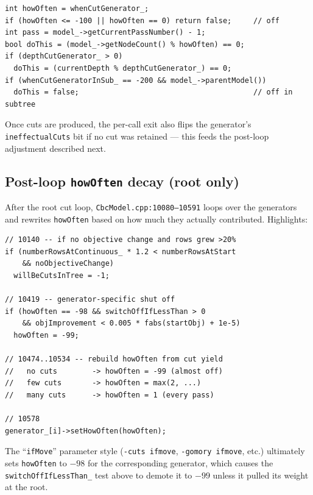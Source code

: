 \documentclass[11pt,a4paper]{article}
\begin{document}
\begin{lstlisting}
int howOften = whenCutGenerator_;
if (howOften <= -100 || howOften == 0) return false;     // off
int pass = model_->getCurrentPassNumber() - 1;
bool doThis = (model_->getNodeCount() % howOften) == 0;
if (depthCutGenerator_ > 0)
  doThis = (currentDepth % depthCutGenerator_) == 0;
if (whenCutGeneratorInSub_ == -200 && model_->parentModel())
  doThis = false;                                        // off in subtree
\end{lstlisting}

Once cuts are produced, the per-call exit also flips the generator's
\texttt{ineffectualCuts} bit if no cut was retained --- this feeds
the post-loop adjustment described next.

\subsection*{Post-loop \texttt{howOften} decay (root only)}

After the root cut loop, \texttt{CbcModel.cpp:10080--10591} loops
over the generators and rewrites \texttt{howOften} based on how much
they actually contributed.  Highlights:

\begin{lstlisting}
// 10140 -- if no objective change and rows grew >20%
if (numberRowsAtContinuous_ * 1.2 < numberRowsAtStart
    && noObjectiveChange)
  willBeCutsInTree = -1;

// 10419 -- generator-specific shut off
if (howOften == -98 && switchOffIfLessThan > 0
    && objImprovement < 0.005 * fabs(startObj) + 1e-5)
  howOften = -99;

// 10474..10534 -- rebuild howOften from cut yield
//   no cuts        -> howOften = -99 (almost off)
//   few cuts       -> howOften = max(2, ...)
//   many cuts      -> howOften = 1 (every pass)

// 10578
generator_[i]->setHowOften(howOften);
\end{lstlisting}

The ``\texttt{ifMove}'' parameter style (\texttt{-cuts ifmove},
\texttt{-gomory ifmove}, etc.) ultimately sets \texttt{howOften} to
$-98$ for the corresponding generator, which causes the
\texttt{switchOffIfLessThan\_} test above to demote it to $-99$
unless it pulled its weight at the root.
\end{document}
